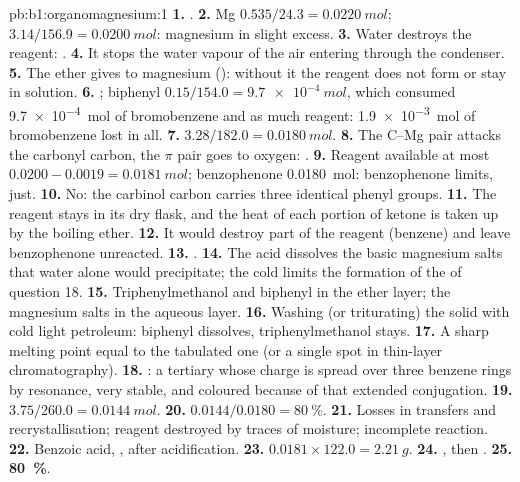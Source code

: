 \begin{solution}{pb:b1:organomagnesium:1}
\textbf{1.} .
\textbf{2.} Mg $0.535/24.3 = \qty{0.0220}{mol}$;  $3.14/156.9 =
\qty{0.0200}{mol}$: magnesium in slight excess.
\textbf{3.} Water destroys the reagent: .
\textbf{4.} It stops the water vapour of the air entering through the
condenser.
\textbf{5.} The ether gives  to magnesium ():
without it the reagent does not form or stay in solution.
\textbf{6.} ; biphenyl
$0.15/154.0 = \qty{9.7e-4}{mol}$, which consumed \qty{9.7e-4}{mol} of
bromobenzene and as much reagent: \qty{1.9e-3}{mol} of bromobenzene lost
in all.
\textbf{7.} $3.28/182.0 = \qty{0.0180}{mol}$.
\textbf{8.} The C--Mg pair attacks the carbonyl carbon, the $\pi$ pair
goes to oxygen:  .
\textbf{9.} Reagent available at most $0.0200 - 0.0019 = \qty{0.0181}{mol}$;
benzophenone \qty{0.0180}{mol}: benzophenone limits, just.
\textbf{10.} No: the carbinol carbon carries three identical phenyl groups.
\textbf{11.} The reagent stays in its dry flask, and the heat of each
portion of ketone is taken up by the boiling ether.
\textbf{12.} It would destroy part of the reagent (benzene) and leave
benzophenone unreacted.
\textbf{13.} .
\textbf{14.} The acid dissolves the basic magnesium salts that water
alone would precipitate; the cold limits the formation of the
 of question 18.
\textbf{15.} Triphenylmethanol and biphenyl in the ether layer; the
magnesium salts in the aqueous layer.
\textbf{16.} Washing (or triturating) the solid with cold light petroleum:
biphenyl dissolves, triphenylmethanol stays.
\textbf{17.} A sharp melting point equal to the tabulated one (or a single
spot in thin-layer chromatography).
\textbf{18.} : a tertiary 
whose charge is spread over three benzene rings by resonance, very
stable, and coloured because of that extended conjugation.
\textbf{19.} $3.75/260.0 = \qty{0.0144}{mol}$.
\textbf{20.} $0.0144/0.0180 = \qty{80}{\percent}$.
\textbf{21.} Losses in transfers and recrystallisation; reagent destroyed
by traces of moisture; incomplete reaction.
\textbf{22.} Benzoic acid, , after acidification.
\textbf{23.} $0.0181 \times 122.0 = \qty{2.21}{g}$.
\textbf{24.} , then
.
\textbf{25.} \textbf{\qty{80}{\percent}}.
\end{solution}
